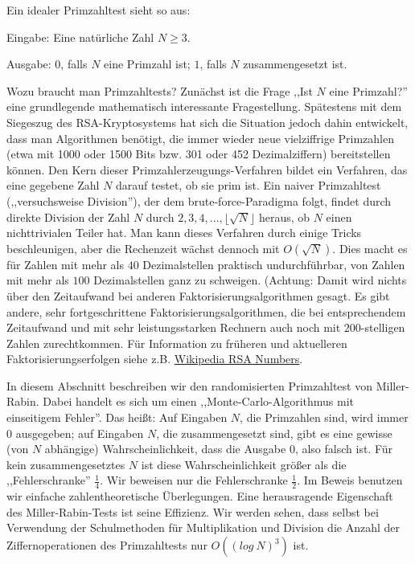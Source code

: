 \documentclass[a4paper]{article}
\begin{document}
\begin{multicols}{3}
        Ein idealer Primzahltest sieht so aus:
        \begin{itemize*}
            \item Eingabe: Eine natürliche Zahl $N\geq 3$.
            \item Ausgabe: $0$, falls $N$ eine Primzahl ist; $1$, falls $N$ zusammengesetzt ist.
        \end{itemize*}

        Wozu braucht man Primzahltests? Zunächst ist die Frage ,,Ist $N$ eine Primzahl?'' eine grundlegende mathematisch interessante Fragestellung. Spätestens mit dem Siegeszug des RSA-Kryptosystems hat sich die Situation jedoch dahin entwickelt, dass man Algorithmen benötigt, die immer wieder neue vielziffrige Primzahlen (etwa mit 1000 oder 1500 Bits bzw. 301 oder 452 Dezimalziffern) bereitstellen können. Den Kern dieser Primzahlerzeugungs-Verfahren bildet ein Verfahren, das eine gegebene Zahl $N$ darauf testet, ob sie prim ist. Ein naiver Primzahltest (,,versuchsweise Division''), der dem brute-force-Paradigma folgt, findet durch direkte Division der Zahl $N$ durch $2,3,4,...,\lfloor\sqrt{N}\rfloor$ heraus, ob $N$ einen nichttrivialen Teiler hat. Man kann dieses Verfahren durch einige Tricks beschleunigen, aber die Rechenzeit wächst dennoch mit $O(\sqrt{N})$. Dies macht es für Zahlen mit mehr als $40$ Dezimalstellen praktisch undurchführbar, von Zahlen mit mehr als $100$ Dezimalstellen ganz zu schweigen. (Achtung: Damit wird nichts über den Zeitaufwand bei anderen Faktorisierungsalgorithmen gesagt. Es gibt andere, sehr fortgeschrittene Faktorisierungsalgorithmen, die bei entsprechendem Zeitaufwand und mit sehr leistungsstarken Rechnern auch noch mit $200$-stelligen Zahlen zurechtkommen. Für Information zu früheren und aktuelleren Faktorisierungserfolgen siehe z.B. \href{http://en.wikipedia.org/wiki/RSA_numbers}{Wikipedia RSA Numbers}.

        In diesem Abschnitt beschreiben wir den randomisierten Primzahltest von Miller-Rabin. Dabei handelt es sich um einen ,,Monte-Carlo-Algorithmus mit einseitigem Fehler''. Das heißt: Auf Eingaben $N$, die Primzahlen sind, wird immer $0$ ausgegeben; auf Eingaben $N$, die zusammengesetzt sind, gibt es eine gewisse (von $N$ abhängige) Wahrscheinlichkeit, dass die Ausgabe $0$, also falsch ist. Für kein zusammengesetztes $N$ ist diese Wahrscheinlichkeit größer als die ,,Fehlerschranke'' $\frac{1}{4}$. Wir beweisen nur die Fehlerschranke $\frac{1}{2}$. Im Beweis benutzen wir einfache zahlentheoretische Überlegungen. Eine herausragende Eigenschaft des Miller-Rabin-Tests ist seine Effizienz. Wir werden sehen, dass selbst bei Verwendung der Schulmethoden für Multiplikation und Division die Anzahl der Ziffernoperationen des Primzahltests nur $O((log\ N)^3)$ ist.


\end{multicols}
\end{document}
